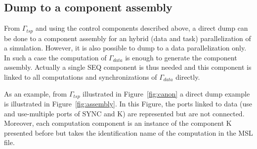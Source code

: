 

\subsection{Dump to a component assembly}
From $\Gamma_{tsp}$ and using the control components described above, a direct dump can be done to a component assembly for an hybrid (data and task) parallelization of a simulation. However, it is also possible to dump to a data parallelization only. In such a case the computation of $\Gamma_{data}$ is enough to generate the component assembly. Actually a single SEQ component is thus needed and this component is linked to all computations and synchronizations of $\Gamma_{data}$ directly.

As an example, from $\Gamma_{tsp}$ illustrated in Figure~\ref{fig:canon} a direct dump example is illustrated in Figure~\ref{fig:assembly}. In this Figure, the ports linked to data (use and use-multiple ports of SYNC and K) are represented but are not connected. Moreover, each computation component is an instance of the component K presented before but takes the identification name of the computation in the MSL file.


